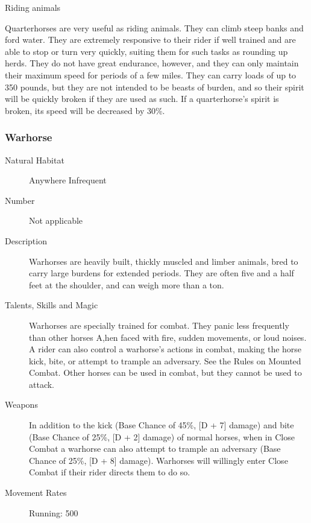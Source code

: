 \begin{mmgroup}{Riding animals}
\begin{mmcomment}
Quarterhorses are very useful as riding animals.  They can climb steep
banks and ford water. They are extremely responsive to their rider if
well trained and are able to stop or turn very quickly, suiting them
for such tasks as rounding up herds. They do not have great endurance,
however, and they can only maintain their maximum speed for periods of
a few miles. They can carry loads of up to 350 pounds, but they are
not intended to be beasts of burden, and so their spirit will be
quickly broken if they are used as such. If a quarterhorse's spirit is
broken, its speed will be decreased by 30\%.

\end{mmcomment}

\subsubsection{Warhorse}

\begin{description}
\item[Natural Habitat] Anywhere Infrequent

\item[Number] Not applicable

\item[Description] Warhorses are heavily built, thickly muscled and limber
animals, bred to carry large burdens for extended periods. They are
often five and a half feet at the shoulder, and can weigh more than a
ton.

\item[Talents, Skills and Magic] Warhorses are specially trained for combat. They panic less
frequently than other horses A,hen faced with fire, sudden movements,
or loud noises. A rider can also control a warhorse's actions in
combat, making the horse kick, bite, or attempt to trample an
adversary.  See the Rules on Mounted Combat. Other horses can be used
in combat, but they cannot be used to attack.

\item[Weapons] In addition to the kick (Base Chance of 45\%, [D + 7]
damage) and bite (Base Chance of 25\%, [D + 2] damage) of normal
horses, when in Close Combat a warhorse can also attempt to trample an
adversary (Base Chance of 25\%, [D + 8] damage).  Warhorses will
willingly enter Close Combat if their rider directs them to do so.

\item[Movement Rates]  Running: 500


\end{description}
\end{mmgroup}
